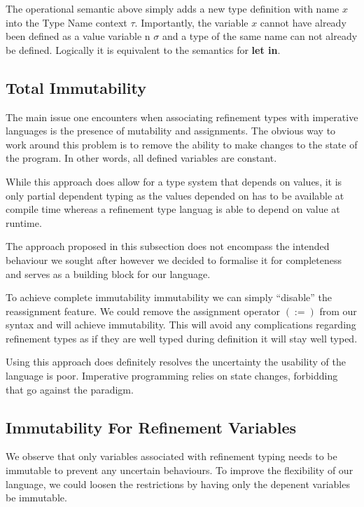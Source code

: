 \documentclass[a4paper,12pt]{report}
\begin{document}
\par
The operational semantic above simply adds a new type definition with name $x$ 
into the Type Name context $\tau$. Importantly, the variable $x$ cannot have 
already been defined as a value variable n $\sigma$ and a type of the same name 
can not already be defined. Logically it is equivalent to the semantics for 
\textbf{let in}.


\subsection{Total Immutability}
The main issue one encounters when associating refinement types with imperative 
languages is the presence of mutability and assignments. The obvious way to 
work around this problem is to remove the ability to make changes to the state 
of the program. In other words, all defined variables are constant. 

\par
While this approach does allow for a type system that depends on values, it is 
only partial dependent typing as the values depended on has to be available at 
compile time whereas a refinement type languag is able to depend on 
value at runtime.

\par
The approach proposed in this subsection does not encompass the intended behaviour we 
sought after however we decided to formalise it for completeness and serves as 
a building block for our language. 

\par
To achieve complete immutability immutability we can simply ``disable'' the 
reassignment feature. We could remove the assignment operator $(:=)$ from our 
syntax and will achieve immutability. This will avoid any complications 
regarding refinement types as 
if they are well typed during definition it will stay well typed. 

\par
Using this approach does definitely resolves the uncertainty the usability of 
the language is poor. Imperative programming relies on state changes, forbidding 
that go against the paradigm. 

\subsection{Immutability For Refinement Variables}
We observe that only variables associated with refinement typing needs to be 
immutable to prevent any uncertain behaviours. To improve the flexibility of our 
language, we could loosen the restrictions by having only the depenent variables 
be immutable. 
\end{document}
